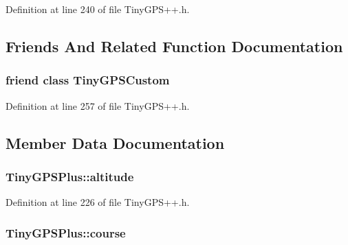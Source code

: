 Definition at line 240 of file Tiny\+G\+P\+S++.\+h.



\subsection{Friends And Related Function Documentation}
\subsubsection[{\texorpdfstring{Tiny\+G\+P\+S\+Custom}{TinyGPSCustom}}]{\setlength{\rightskip}{0pt plus 5cm}friend class {\bf Tiny\+G\+P\+S\+Custom}\hspace{0.3cm}{\ttfamily [friend]}}\hypertarget{class_tiny_g_p_s_plus_aaad5bf5a2728a81e624ad2304f817772}{}\label{class_tiny_g_p_s_plus_aaad5bf5a2728a81e624ad2304f817772}


Definition at line 257 of file Tiny\+G\+P\+S++.\+h.



\subsection{Member Data Documentation}
\subsubsection[{\texorpdfstring{altitude}{altitude}}]{ Tiny\+G\+P\+S\+Plus\+::altitude}\hypertarget{class_tiny_g_p_s_plus_a0b3451a4ee75e5880ffd88c3038eacf8}{}\label{class_tiny_g_p_s_plus_a0b3451a4ee75e5880ffd88c3038eacf8}


Definition at line 226 of file Tiny\+G\+P\+S++.\+h.

\subsubsection[{\texorpdfstring{course}{course}}]{ Tiny\+G\+P\+S\+Plus\+::course}\hypertarget{class_tiny_g_p_s_plus_ad7800d3decbe58e355f5229bba231868}{}\label{class_tiny_g_p_s_plus_ad7800d3decbe58e355f5229bba231868}


